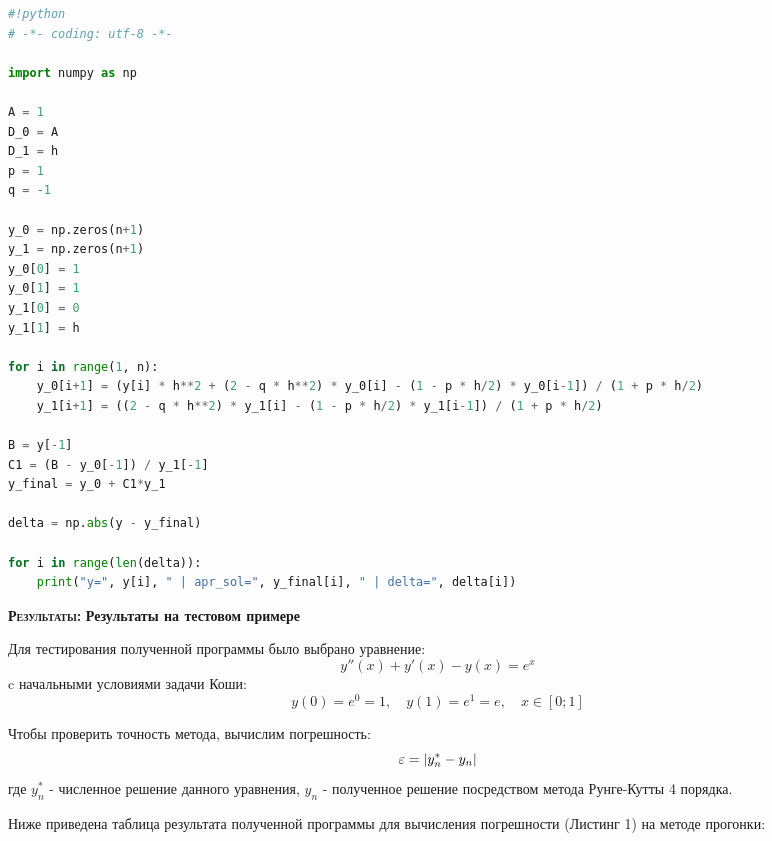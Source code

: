 \documentclass [12pt]{article}
\DeclarePairedDelimiter{\abs}{\lvert}{\rvert}
\begin{document}
\begin{lstlisting}[language=python]
#!python
# -*- coding: utf-8 -*-

import numpy as np

A = 1
D_0 = A
D_1 = h
p = 1
q = -1

y_0 = np.zeros(n+1)
y_1 = np.zeros(n+1)
y_0[0] = 1
y_0[1] = 1
y_1[0] = 0
y_1[1] = h

for i in range(1, n):
    y_0[i+1] = (y[i] * h**2 + (2 - q * h**2) * y_0[i] - (1 - p * h/2) * y_0[i-1]) / (1 + p * h/2)
    y_1[i+1] = ((2 - q * h**2) * y_1[i] - (1 - p * h/2) * y_1[i-1]) / (1 + p * h/2)

B = y[-1]
C1 = (B - y_0[-1]) / y_1[-1]
y_final = y_0 + C1*y_1

delta = np.abs(y - y_final)

for i in range(len(delta)):
    print("y=", y[i], " | apr_sol=", y_final[i], " | delta=", delta[i])
\end{lstlisting}

\textsc{\textbf{Результаты:}}
\textbf{Результаты на тестовом примере}

Для тестирования полученной программы было выбрано уравнение: $$y''(x)+y'(x)-y(x)=e^x$$
c начальными условиями задачи Коши: $$ y(0)=e^0=1, \quad y(1)=e^1=e, \quad x \in [0;1] $$

Чтобы проверить точность метода, вычислим погрешность: $$\varepsilon=\abs{y^{*}_{n}-y_{n}}$$ где $y^{*}_{n}$ - численное решение данного уравнения, $y_{n}$ - полученное решение посредством метода Рунге-Кутты 4 порядка. 

Ниже приведена таблица результата полученной программы для вычисления погрешности (Листинг 1) на методе прогонки:
\end{document}
